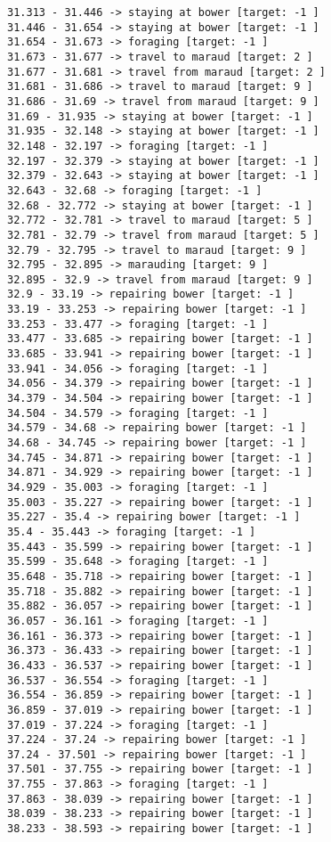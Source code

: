 \documentclass[11pt]{article}
\begin{document}
\begin{Verbatim}[commandchars=\\\{\}]
31.313 - 31.446 -> staying at bower [target: -1 ]
31.446 - 31.654 -> staying at bower [target: -1 ]
31.654 - 31.673 -> foraging [target: -1 ]
31.673 - 31.677 -> travel to maraud [target: 2 ]
31.677 - 31.681 -> travel from maraud [target: 2 ]
31.681 - 31.686 -> travel to maraud [target: 9 ]
31.686 - 31.69 -> travel from maraud [target: 9 ]
31.69 - 31.935 -> staying at bower [target: -1 ]
31.935 - 32.148 -> staying at bower [target: -1 ]
32.148 - 32.197 -> foraging [target: -1 ]
32.197 - 32.379 -> staying at bower [target: -1 ]
32.379 - 32.643 -> staying at bower [target: -1 ]
32.643 - 32.68 -> foraging [target: -1 ]
32.68 - 32.772 -> staying at bower [target: -1 ]
32.772 - 32.781 -> travel to maraud [target: 5 ]
32.781 - 32.79 -> travel from maraud [target: 5 ]
32.79 - 32.795 -> travel to maraud [target: 9 ]
32.795 - 32.895 -> marauding [target: 9 ]
32.895 - 32.9 -> travel from maraud [target: 9 ]
32.9 - 33.19 -> repairing bower [target: -1 ]
33.19 - 33.253 -> repairing bower [target: -1 ]
33.253 - 33.477 -> foraging [target: -1 ]
33.477 - 33.685 -> repairing bower [target: -1 ]
33.685 - 33.941 -> repairing bower [target: -1 ]
33.941 - 34.056 -> foraging [target: -1 ]
34.056 - 34.379 -> repairing bower [target: -1 ]
34.379 - 34.504 -> repairing bower [target: -1 ]
34.504 - 34.579 -> foraging [target: -1 ]
34.579 - 34.68 -> repairing bower [target: -1 ]
34.68 - 34.745 -> repairing bower [target: -1 ]
34.745 - 34.871 -> repairing bower [target: -1 ]
34.871 - 34.929 -> repairing bower [target: -1 ]
34.929 - 35.003 -> foraging [target: -1 ]
35.003 - 35.227 -> repairing bower [target: -1 ]
35.227 - 35.4 -> repairing bower [target: -1 ]
35.4 - 35.443 -> foraging [target: -1 ]
35.443 - 35.599 -> repairing bower [target: -1 ]
35.599 - 35.648 -> foraging [target: -1 ]
35.648 - 35.718 -> repairing bower [target: -1 ]
35.718 - 35.882 -> repairing bower [target: -1 ]
35.882 - 36.057 -> repairing bower [target: -1 ]
36.057 - 36.161 -> foraging [target: -1 ]
36.161 - 36.373 -> repairing bower [target: -1 ]
36.373 - 36.433 -> repairing bower [target: -1 ]
36.433 - 36.537 -> repairing bower [target: -1 ]
36.537 - 36.554 -> foraging [target: -1 ]
36.554 - 36.859 -> repairing bower [target: -1 ]
36.859 - 37.019 -> repairing bower [target: -1 ]
37.019 - 37.224 -> foraging [target: -1 ]
37.224 - 37.24 -> repairing bower [target: -1 ]
37.24 - 37.501 -> repairing bower [target: -1 ]
37.501 - 37.755 -> repairing bower [target: -1 ]
37.755 - 37.863 -> foraging [target: -1 ]
37.863 - 38.039 -> repairing bower [target: -1 ]
38.039 - 38.233 -> repairing bower [target: -1 ]
38.233 - 38.593 -> repairing bower [target: -1 ]

\end{Verbatim}
\end{document}
